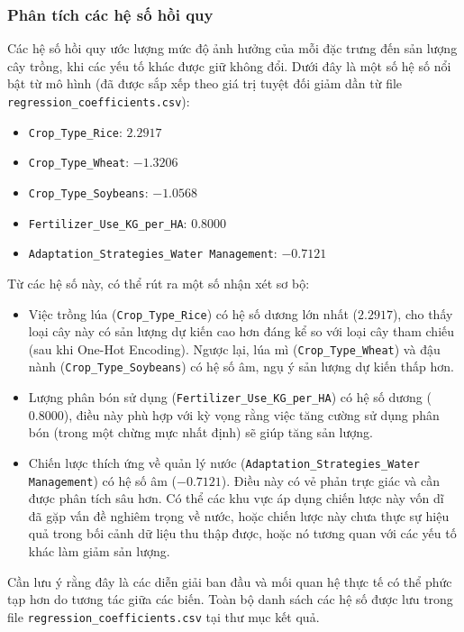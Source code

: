 \subsubsection{Phân tích các hệ số hồi quy}
\label{subsubsec:lr_coefficients}

Các hệ số hồi quy ước lượng mức độ ảnh hưởng của mỗi đặc trưng đến sản lượng cây trồng, khi các yếu tố khác được giữ không đổi. Dưới đây là một số hệ số nổi bật từ mô hình (đã được sắp xếp theo giá trị tuyệt đối giảm dần từ file \texttt{regression\_coefficients.csv}):

\begin{itemize}
    \item \texttt{Crop\_Type\_Rice}: $2.2917$
    \item \texttt{Crop\_Type\_Wheat}: $-1.3206$
    \item \texttt{Crop\_Type\_Soybeans}: $-1.0568$
    \item \texttt{Fertilizer\_Use\_KG\_per\_HA}: $0.8000$
    \item \texttt{Adaptation\_Strategies\_Water Management}: $-0.7121$
\end{itemize}

Từ các hệ số này, có thể rút ra một số nhận xét sơ bộ:
\begin{itemize}
    \item Việc trồng lúa (\texttt{Crop\_Type\_Rice}) có hệ số dương lớn nhất ($2.2917$), cho thấy loại cây này có sản lượng dự kiến cao hơn đáng kể so với loại cây tham chiếu (sau khi One-Hot Encoding). Ngược lại, lúa mì (\texttt{Crop\_Type\_Wheat}) và đậu nành (\texttt{Crop\_Type\_Soybeans}) có hệ số âm, ngụ ý sản lượng dự kiến thấp hơn.
    \item Lượng phân bón sử dụng (\texttt{Fertilizer\_Use\_KG\_per\_HA}) có hệ số dương ($0.8000$), điều này phù hợp với kỳ vọng rằng việc tăng cường sử dụng phân bón (trong một chừng mực nhất định) sẽ giúp tăng sản lượng.
    \item Chiến lược thích ứng về quản lý nước (\texttt{Adaptation\_Strategies\_Water Management}) có hệ số âm ($-0.7121$). Điều này có vẻ phản trực giác và cần được phân tích sâu hơn. Có thể các khu vực áp dụng chiến lược này vốn dĩ đã gặp vấn đề nghiêm trọng về nước, hoặc chiến lược này chưa thực sự hiệu quả trong bối cảnh dữ liệu thu thập được, hoặc nó tương quan với các yếu tố khác làm giảm sản lượng.
\end{itemize}
Cần lưu ý rằng đây là các diễn giải ban đầu và mối quan hệ thực tế có thể phức tạp hơn do tương tác giữa các biến. Toàn bộ danh sách các hệ số được lưu trong file \texttt{regression\_coefficients.csv} tại thư mục kết quả.


